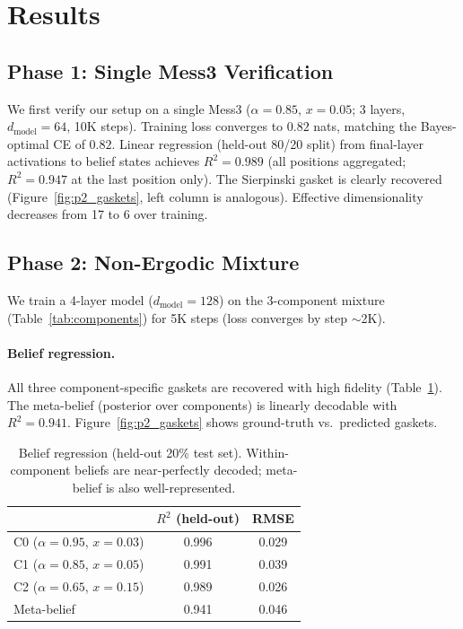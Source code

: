 \section{Results}
\label{sec:results}

\subsection{Phase 1: Single Mess3 Verification}

We first verify our setup on a single Mess3 ($\alpha = 0.85$, $x = 0.05$; 3 layers, $d_{\text{model}} = 64$, 10K steps). Training loss converges to $0.82$ nats, matching the Bayes-optimal CE of $0.82$. Linear regression (held-out 80/20 split) from final-layer activations to belief states achieves $R^2 = 0.989$ (all positions aggregated; $R^2 = 0.947$ at the last position only). The Sierpinski gasket is clearly recovered (Figure~\ref{fig:p2_gaskets}, left column is analogous). Effective dimensionality decreases from 17 to 6 over training.

\subsection{Phase 2: Non-Ergodic Mixture}

We train a 4-layer model ($d_{\text{model}} = 128$) on the 3-component mixture (Table~\ref{tab:components}) for 5K steps (loss converges by step $\sim$2K).

\paragraph{Belief regression.} All three component-specific gaskets are recovered with high fidelity (Table~\ref{tab:regression}). The meta-belief (posterior over components) is linearly decodable with $R^2 = 0.941$. Figure~\ref{fig:p2_gaskets} shows ground-truth vs.\ predicted gaskets.

\begin{table}[h]
\centering
\small
\begin{tabular}{lcc}
\toprule
 & $R^2$ (held-out) & RMSE \\
\midrule
C0 ($\alpha{=}0.95$, $x{=}0.03$) & 0.996 & 0.029 \\
C1 ($\alpha{=}0.85$, $x{=}0.05$) & 0.991 & 0.039 \\
C2 ($\alpha{=}0.65$, $x{=}0.15$) & 0.989 & 0.026 \\
Meta-belief & 0.941 & 0.046 \\
\bottomrule
\end{tabular}
\caption{Belief regression (held-out 20\% test set). Within-component beliefs are near-perfectly decoded; meta-belief is also well-represented.}
\label{tab:regression}
\end{table}

